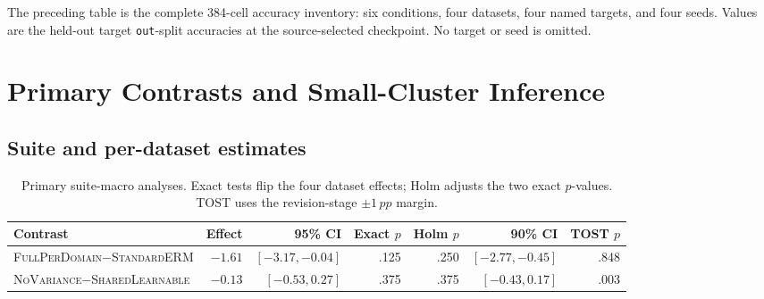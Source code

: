 \documentclass[10pt]{article}
\newcommand{\pp}{\,pp}
\newcommand{\full}{\textsc{FullPerDomain}}
\newcommand{\erm}{\textsc{StandardERM}}
\newcommand{\shared}{\textsc{SharedLearnable}}
\newcommand{\novar}{\textsc{NoVariance}}
\begin{document}
\noindent
The preceding table is the complete 384-cell accuracy inventory: six
conditions, four datasets, four named targets, and four seeds. Values are the
held-out target \texttt{out}-split accuracies at the source-selected
checkpoint. No target or seed is omitted.

\section{Primary Contrasts and Small-Cluster Inference}
\label{sec:inference}

\subsection{Suite and per-dataset estimates}

\begin{table}[H]
\centering
\caption{Primary suite-macro analyses. Exact tests flip the four dataset
effects; Holm adjusts the two exact $p$-values. TOST uses the revision-stage
$\pm1\pp$ margin.}
\label{tab:primary-suite}
\small
\setlength{\tabcolsep}{4pt}
\begin{tabular}{lrrrrrr}
\toprule
Contrast & Effect & 95\% CI & Exact $p$ & Holm $p$ & 90\% CI & TOST $p$ \\
\midrule
\full{}$-$\erm{} & $-1.61$ & $[-3.17,-0.04]$ & .125 & .250 &
$[-2.77,-0.45]$ & .848 \\
\novar{}$-$\shared{} & $-0.13$ & $[-0.53,0.27]$ & .375 & .375 &
$[-0.43,0.17]$ & .003 \\
\bottomrule
\end{tabular}
\end{table}
\end{document}
